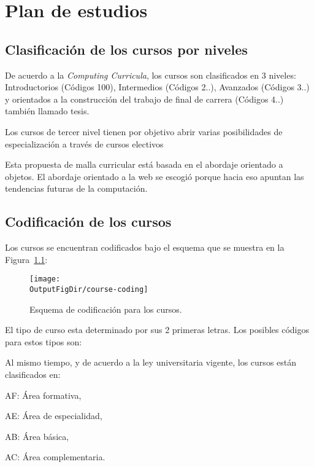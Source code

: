 \chapter{Plan de estudios \YYYY}\label{chap:GeneralInfo} 

\section{Clasificación de los cursos por niveles}
De acuerdo a la \textit{Computing Curricula}, los cursos son clasificados en 3 niveles: Introductorios (Códigos 100), 
Intermedios  (Códigos 2..), Avanzados  (Códigos 3..) y orientados a la construcción del trabajo de final de carrera  (Códigos 4..) también llamado tesis.

Los cursos de tercer nivel tienen por objetivo abrir varias posibilidades de especialización a través de cursos electivos

Esta propuesta de malla curricular está basada en el abordaje orientado a objetos. 
El abordaje orientado a la web se escogió porque hacia eso apuntan las tendencias 
futuras de la computación.

\section{Codificación de los cursos}
Los cursos se encuentran codificados bajo el esquema que se muestra en la Figura~\ref{fig:course-number}:

\begin{figure}[ht]
   \centering
   \texttt{[image: \\OutputFigDir/course-coding]}
   \caption{Esquema de codificación para los cursos.}
   \label{fig:course-number}
\end{figure}

El tipo de curso esta determinado por sus 2 primeras letras. Los posibles códigos para estos tipos son:


Al mismo tiempo, y de acuerdo a la ley universitaria vigente, los cursos están clasificados en:
\begin{inparadesc}
\item [AF:] Área formativa,
\item [AE:] Área de especialidad,
\item [AB:] Área básica,
\item [AC:] Área complementaria.
\end{inparadesc}



